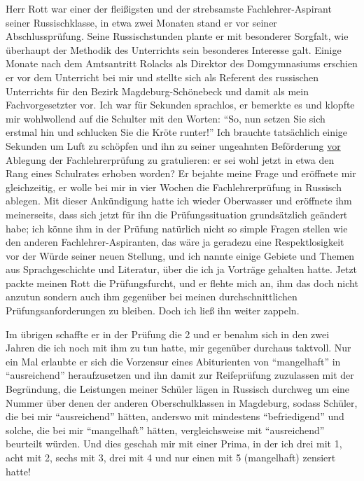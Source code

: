 \documentclass[a5paper,pagesize,10pt,twoside=true]{scrbook}
\renewcommand{\marginpar}[2][]{}
\begin{document}
Herr Rott war einer der fleißigsten und der strebsamste Fachlehrer-Aspirant seiner Russischklasse, \marginpar{153} in etwa zwei Monaten stand er vor seiner Abschlussprüfung. Seine Russischstunden plante er mit besonderer Sorgfalt, wie überhaupt der Methodik des Unterrichts sein besonderes Interesse galt. Einige Monate nach dem Amtsantritt Rolacks als Direktor des Domgymnasiums erschien er vor dem Unterricht bei mir und stellte sich als Referent des russischen Unterrichts für den Bezirk Magdeburg-Schönebeck und damit als mein Fachvorgesetzter vor. Ich war für Sekunden sprachlos, er bemerkte es und klopfte mir wohlwollend auf die Schulter mit den Worten: \enquote{So, nun setzen Sie sich erstmal hin und schlucken Sie die Kröte runter!} Ich brauchte tatsächlich einige Sekunden um Luft zu schöpfen und ihn zu seiner ungeahnten Beförderung \underline{vor} Ablegung der Fachlehrerprüfung zu gratulieren: er sei wohl jetzt in etwa den Rang eines Schulrates erhoben worden? Er bejahte meine Frage und eröffnete mir gleichzeitig, er wolle bei mir in vier Wochen die Fachlehrerprüfung in Russisch ablegen. Mit dieser Ankündigung hatte ich wieder Oberwasser und eröffnete ihm meinerseits, dass sich jetzt für ihn die Prüfungssituation grundsätzlich geändert habe; ich könne ihm in der Prüfung \marginpar{154} natürlich nicht so simple Fragen stellen wie den anderen Fachlehrer-Aspiranten, das wäre ja geradezu eine Respektlosigkeit vor der Würde seiner neuen Stellung, und ich nannte einige Gebiete und Themen aus Sprachgeschichte und Literatur, über die ich ja Vorträge gehalten hatte. Jetzt packte meinen Rott die Prüfungsfurcht, und er flehte mich an, ihm das doch nicht anzutun sondern auch ihm gegenüber bei meinen durchschnittlichen Prüfungsanforderungen zu bleiben. Doch ich ließ ihn weiter zappeln.

Im übrigen schaffte er in der Prüfung die 2 und er benahm sich in den zwei Jahren die ich noch mit ihm zu tun hatte, mir gegenüber durchaus taktvoll. Nur ein Mal erlaubte er sich die Vorzensur eines Abiturienten von \enquote{mangelhaft} in \enquote{ausreichend} heraufzusetzen und ihn damit zur Reifeprüfung zuzulassen mit der Begründung, die Leistungen meiner Schüler lägen in Russisch durchweg um eine Nummer über denen der anderen Oberschulklassen in Magdeburg, sodass Schüler, die bei mir \enquote{ausreichend} hätten, anderswo mit mindestens \enquote{befriedigend} und solche, die bei mir \enquote{mangelhaft} hätten, vergleichsweise mit \enquote{ausreichend} beurteilt würden. Und dies geschah mir mit einer Prima, in der ich drei \marginpar{155} mit 1, acht mit 2, sechs mit 3, drei mit 4 und nur einen mit 5 (mangelhaft) zensiert hatte!
\end{document}
